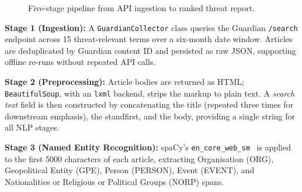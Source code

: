 \documentclass[12pt,lettersize,journal,onecolumn]{IEEEtran}
\begin{document}
\begin{figure}[ht]
\centering
{}
\caption{Five-stage pipeline from API ingestion to ranked threat report.}
\label{fig:arch}
\end{figure}

\textbf{Stage 1 (Ingestion):} A \texttt{GuardianCollector} class queries the Guardian \texttt{/search} endpoint across 15 threat-relevant terms over a six-month date window. Articles are deduplicated by Guardian content ID and persisted as raw JSON, supporting offline re-runs without repeated API calls.

\textbf{Stage 2 (Preprocessing):} Article bodies are returned as HTML; \texttt{BeautifulSoup}, with an \texttt{lxml} backend, strips the markup to plain text. A \textit{search text} field is then constructed by concatenating the title (repeated three times for downstream emphasis), the standfirst, and the body, providing a single string for all NLP stages.

\textbf{Stage 3 (Named Entity Recognition):} spaCy's \texttt{en\_core\_web\_sm}~\cite{spacy2} is applied to the first 5000 characters of each article, extracting Organisation (ORG), Geopolitical Entity (GPE), Person (PERSON), Event (EVENT), and Nationalities or Religious or Political Groups (NORP) spans.
\end{document}
